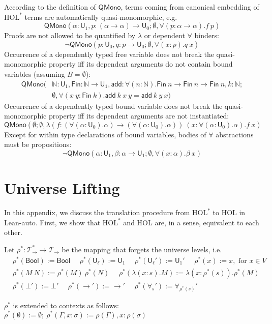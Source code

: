   \noindent According to the definition of $\mathsf{QMono}$, terms coming from canonical embedding of $\text{HOL}^*$
  terms are automatically quasi-monomorphic, e.g.
  $$\mathsf{QMono}(\alpha : \mathsf{U}_1, p : (\alpha \to \alpha) \to \mathsf{U}_0; \emptyset, \forall (p : \alpha \to \alpha). f \ p)$$
  Proofs are not allowed to be quantified by $\lambda$ or dependent $\forall$ binders:
  $$\neg \mathsf{QMono}(p : \mathsf{U}_0, q : p \to \mathsf{U}_0; \emptyset, \forall (x : p). q \ x)$$
  Occurrence of a dependently typed free variable does not break the quasi-monomorphic property iff
  its dependent arguments do not contain bound variables (assuming $B = \emptyset$):
  \begin{align*}
    \mathsf{QMono}(
    & \mathbb{N} : \mathsf{U}_1, \mathsf{Fin} : \mathbb{N} \to \mathsf{U}_1,
      \mathsf{add} : \forall (n : \mathbb{N}). \mathsf{Fin} \ n \to \mathsf{Fin} \ n \to \mathsf{Fin} \ n, k : \mathbb{N}; \\
    & \emptyset, \forall (x \ y : \mathsf{Fin} \ k). \mathsf{add} \ k \ x \ y = \mathsf{add} \ k \ y \ x)
  \end{align*}
  Occurrence of a dependently typed bound variable does not break the quasi-monomorphic property iff
  its dependent arguments are not instantiated:
  $$\mathsf{QMono}(\emptyset; \emptyset, \lambda (f : (\forall (\alpha : \mathsf{U}_0). \alpha) \to (\forall (\alpha : \mathsf{U}_0). \alpha)) \
    (x : \forall (\alpha : \mathsf{U}_0). \alpha). f \ x)$$
  Except for within type declarations of bound variables, bodies of $\forall$ abstractions must be propositions:
  $$\neg \mathsf{QMono}(\alpha : \mathsf{U}_1, \beta : \alpha \to \mathsf{U}_1; \emptyset, \forall (x : \alpha). \beta \ x)$$

\section{Universe Lifting}\label{appulift}

  In this appendix, we discuss the translation procedure from $\text{HOL}^*$ to HOL
  in Lean-auto. First, we show that $\text{HOL}^*$ and HOL are, in a sense, equivalent to each other.

  \begin{definition}
    Let $\rho^* : \mathcal{T}_\to^* \to \mathcal{T}_\to$ be the mapping that forgets the universe levels, i.e.
    $$\begin{aligned}
    & \rho^*(\mathsf{Bool}) := \mathsf{Bool} \ \ \ \ \ \ \rho^*(\mathsf{U}_\ell) := \mathsf{U}_1 \ \ \ \ \ \
      \rho^*(\mathsf{U}_\ell') := \mathsf{U}_1' \ \ \ \ \ \ \rho^*(x) := x, \text{ for }x \in V \\
    & \rho^*(M \ N) := \rho^*(M) \ \rho^*(N) \ \ \ \ \ \ \rho^*(\lambda (x : s). M) := \lambda (x : \rho^*(s)). \rho^*(M) \\
    & \rho^*(\bot') := \bot' \ \ \ \ \ \ \rho^*(\to') := \to' \ \ \ \ \ \ \rho^*(\forall_s') := \forall_{\rho^*(s)}'
    \end{aligned}$$

    \noindent $\rho^*$ is extended to contexts as follows: $\rho^*(\emptyset) := \emptyset; \ \rho^*(\Gamma, x : \sigma) := \rho(\Gamma), x : \rho(\sigma)$
  \end{definition}

